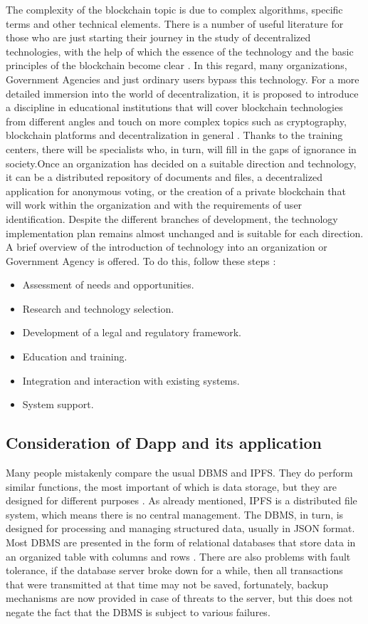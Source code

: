 \documentclass[10pt,conference,a4paper]{IEEEtran_EDM}
\begin{document}
The complexity of the blockchain topic is due to complex algorithms, specific terms and other technical elements. There is a number of useful literature for those who are just starting their journey in the study of decentralized technologies, with the help of which the essence of the technology and the basic principles of the blockchain become clear \cite{Kube}. In this regard, many organizations, Government Agencies and just ordinary users bypass this technology. For a more detailed immersion into the world of decentralization, it is proposed to introduce a discipline in educational institutions that will cover blockchain technologies from different angles and touch on more complex topics such as cryptography, blockchain platforms and decentralization in general \cite{Bashir}. Thanks to the training centers, there will be specialists who, in turn, will fill in the gaps of ignorance in society.Once an organization has decided on a suitable direction and technology, it can be a distributed repository of documents and files, a decentralized application for anonymous voting, or the creation of a private blockchain that will work within the organization and with the requirements of user identification. Despite the different branches of development, the technology implementation plan remains almost unchanged and is suitable for each direction. A brief overview of the introduction of technology into an organization or Government Agency is offered. To do this, follow these steps \cite{Talapina}:
\begin{itemize}
    \item Assessment of needs and opportunities.
    \item Research and technology selection.
    \item Development of a legal and regulatory framework.
    \item Education and training.
    \item Integration and interaction with existing systems.
    \item System support.
\end{itemize}

\subsection{Consideration of Dapp and its application}

Many people mistakenly compare the usual DBMS and IPFS. They do perform similar functions, the most important of which is data storage, but they are designed for different purposes \cite{Ruan}. As already mentioned, IPFS is a distributed file system, which means there is no central management. The DBMS, in turn, is designed for processing and managing structured data, usually in JSON format. Most DBMS are presented in the form of relational databases that store data in an organized table with columns and rows \cite{Gillenson}. There are also problems with fault tolerance, if the database server broke down for a while, then all transactions that were transmitted at that time may not be saved, fortunately, backup mechanisms are now provided in case of threats to the server, but this does not negate the fact that the DBMS is subject to various failures. 
\end{document}
